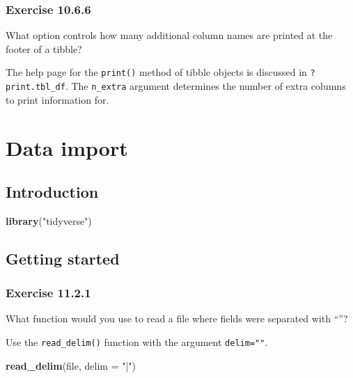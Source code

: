 \documentclass[]{book}
\newenvironment{Shaded}{\begin{snugshade}}{\end{snugshade}}
\newcommand{\DataTypeTok}[1]{\textcolor[rgb]{0.13,0.29,0.53}{#1}}
\newcommand{\KeywordTok}[1]{\textcolor[rgb]{0.13,0.29,0.53}{\textbf{#1}}}
\newcommand{\NormalTok}[1]{#1}
\newcommand{\StringTok}[1]{\textcolor[rgb]{0.31,0.60,0.02}{#1}}
\theoremstyle{plain}
\theoremstyle{remark}
\begin{document}
\hypertarget{exercise-10.6.6}{%
\subsection*{\texorpdfstring{Exercise
{10.6.6}}{Exercise 10.6.6}}\label{exercise-10.6.6}}

What option controls how many additional column names are printed at the
footer of a tibble?

The help page for the \texttt{print()} method of tibble objects is
discussed in \texttt{?print.tbl\_df}. The \texttt{n\_extra} argument
determines the number of extra columns to print information for.

\hypertarget{data-import}{%
\chapter{Data import}\label{data-import}}

\hypertarget{introduction-6}{%
\section{Introduction}\label{introduction-6}}

\begin{Shaded}
\begin{Highlighting}[]
\KeywordTok{library}\NormalTok{(}\StringTok{"tidyverse"}\NormalTok{)}
\end{Highlighting}
\end{Shaded}

\hypertarget{getting-started}{%
\section{Getting started}\label{getting-started}}

\hypertarget{exercise-11.2.1}{%
\subsection*{\texorpdfstring{Exercise
{11.2.1}}{Exercise 11.2.1}}\label{exercise-11.2.1}}

What function would you use to read a file where fields were separated
with ``\textbar{}''?

Use the \texttt{read\_delim()} function with the argument
\texttt{delim="\textbar{}"}.

\begin{Shaded}
\begin{Highlighting}[]
\KeywordTok{read_delim}\NormalTok{(file, }\DataTypeTok{delim =} \StringTok{"|"}\NormalTok{)}
\end{Highlighting}
\end{Shaded}
\end{document}
